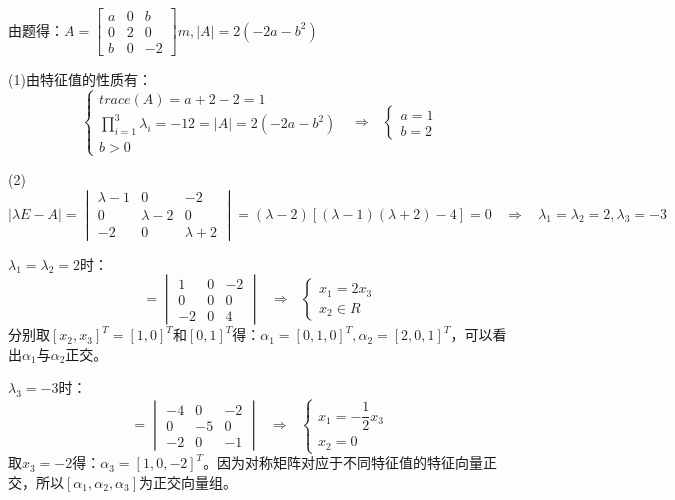\documentclass{article}
\begin{document}
\begin{jie}
由题得：$A=
\begin{bmatrix}
  a & 0 & b\\
  0 & 2 & 0\\
  b & 0 & -2
\end{bmatrix}m,|A|=2(-2a-b^2)
$

(1)由特征值的性质有：
\begin{equation*}
\begin{cases}
trace(A)=a+2-2=1\\
\prod\limits_{i=1}^{3}\lambda_i=-12=|A|=2(-2a-b^2)\\
b>0
\end{cases}~~~\Rightarrow~~~
\begin{cases}
a=1\\
b=2
\end{cases}
\end{equation*}

(2)
\begin{equation*}
  |\lambda E-A|=
  \begin{vmatrix}
  \lambda-1& 0 & -2\\
  0 & \lambda-2 & 0\\
  -2 & 0 & \lambda+2
  \end{vmatrix}=(\lambda-2)[(\lambda-1)(\lambda+2)-4]=0~~~~\Rightarrow~~~~\lambda_1=\lambda_2=2,\lambda_3=-3
\end{equation*}

$\lambda_1=\lambda_2=2$时：
\begin{equation*}
  [\lambda E-A]=
  \begin{vmatrix}
  1& 0 & -2\\
  0 & 0 & 0\\
  -2 & 0 & 4
  \end{vmatrix}~~~\Rightarrow~~~
  \begin{cases}
   x_1=2x_3\\
   x_2\in R
  \end{cases}
\end{equation*}
分别取$[x_2,x_3]^T=[1,0]^T$和$[0,1]^T$得：$\alpha_1=[0,1,0]^T,\alpha_{2}=[2,0,1]^T$，可以看出$\alpha_1$与$\alpha_2$正交。

$\lambda_3=-3$时：
\begin{equation*}
  [\lambda E-A]=
  \begin{vmatrix}
  -4& 0 & -2\\
  0 & -5 & 0\\
  -2 & 0 & -1
  \end{vmatrix}~~~\Rightarrow~~~
  \begin{cases}
   x_1=-\dfrac{1}{2}x_3\\
   x_2=0
  \end{cases}
\end{equation*}
取$x_3=-2$得：$\alpha_3=[1,0,-2]^T$。因为对称矩阵对应于不同特征值的特征向量正交，所以$[\alpha_1,\alpha_2,\alpha_3]$为正交向量组。


\end{jie}
\end{document}
